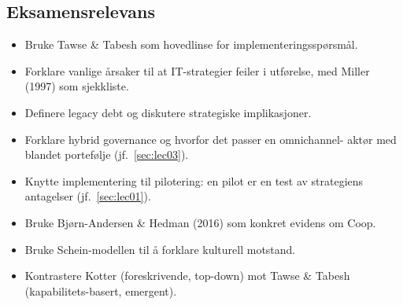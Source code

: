 \subsection{Eksamensrelevans}
\begin{itemize}
  \item Bruke Tawse \& Tabesh som hovedlinse for implementeringsspørsmål.
  \item Forklare vanlige årsaker til at IT-strategier feiler i utførelse,
    med Miller (1997) som sjekkliste.
  \item Definere legacy debt og diskutere strategiske implikasjoner.
  \item Forklare hybrid governance og hvorfor det passer en omnichannel-
    aktør med blandet portefølje (jf.\ \autoref{sec:lec03}).
  \item Knytte implementering til pilotering: en pilot er en test av
    strategiens antagelser (jf.\ \autoref{sec:lec01}).
  \item Bruke Bjørn-Andersen \& Hedman (2016) som konkret evidens om Coop.
  \item Bruke Schein-modellen til å forklare kulturell motstand.
  \item Kontrastere Kotter (foreskrivende, top-down) mot Tawse \& Tabesh
    (kapabilitets-basert, emergent).
\end{itemize}
